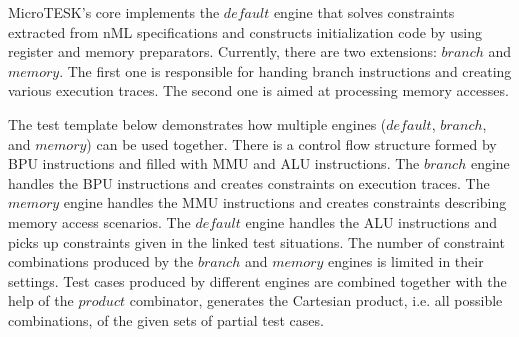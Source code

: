 MicroTESK's core implements the $default$ engine that solves constraints extracted from nML specifications and constructs initialization code by using register and memory preparators.
Currently, there are two extensions: $branch$ and $memory$.
The first one is responsible for handing branch instructions and creating various execution traces.
The second one is aimed at processing memory accesses.

The test template below demonstrates how multiple engines ($default$, $branch$, and $memory$) can be used together.
There is a control flow structure formed by BPU instructions and filled with MMU and ALU instructions.
The $branch$ engine handles the BPU instructions and creates constraints on execution traces.
The $memory$ engine handles the MMU instructions and creates constraints describing memory access scenarios.
The $default$ engine handles the ALU instructions and picks up constraints given in the linked test situations.
The number of constraint combinations produced by the $branch$ and $memory$ engines is limited in their settings.
Test cases produced by different engines are combined together with the help of the $product$ combinator,
generates the Cartesian product, i.e. all possible combinations, of the given sets of partial test cases.

